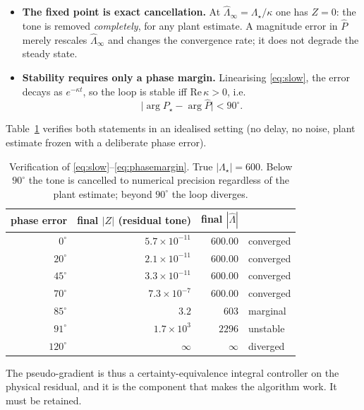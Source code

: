 \documentclass[11pt]{article}
\begin{document}
\begin{itemize}\itemsep2pt
  \item \textbf{The fixed point is exact cancellation.} At
    $\hat\Lambda_\infty=\Lambda_\star/\kappa$ one has $Z=0$: the tone is
    removed \emph{completely}, for any plant estimate. A magnitude error in
    $\hat P$ merely rescales $\hat\Lambda_\infty$ and changes the
    convergence rate; it does not degrade the steady state.
  \item \textbf{Stability requires only a phase margin.} Linearising
    \eqref{eq:slow}, the error decays as $e^{-\kappa t}$, so the loop is
    stable iff $\mathrm{Re}\,\kappa>0$, i.e.
    \begin{equation}
      \big|\arg P_\star-\arg\hat P\big|<90^\circ .
      \label{eq:phasemargin}
    \end{equation}
\end{itemize}

Table~\ref{tab:phase} verifies both statements in an idealised setting
(no delay, no noise, plant estimate frozen with a deliberate phase error).

\begin{table}[h]
  \centering
  \begin{tabular}{rrrl}
    \toprule
    phase error & final $|Z|$ (residual tone) & final $|\hat\Lambda|$ & \\
    \midrule
    $0^\circ$   & $5.7\times10^{-11}$ & $600.00$ & converged\\
    $20^\circ$  & $2.1\times10^{-11}$ & $600.00$ & converged\\
    $45^\circ$  & $3.3\times10^{-11}$ & $600.00$ & converged\\
    $70^\circ$  & $7.3\times10^{-7}$  & $600.00$ & converged\\
    $85^\circ$  & $3.2$               & $603$    & marginal\\
    $91^\circ$  & $1.7\times10^{3}$   & $2296$   & unstable\\
    $120^\circ$ & $\infty$            & $\infty$ & diverged\\
    \bottomrule
  \end{tabular}
  \caption{Verification of \eqref{eq:slow}--\eqref{eq:phasemargin}. True
  $|\Lambda_\star|=600$. Below $90^\circ$ the tone is cancelled to
  numerical precision regardless of the plant estimate; beyond $90^\circ$
  the loop diverges.}
  \label{tab:phase}
\end{table}

The pseudo-gradient is thus a certainty-equivalence integral controller on
the physical residual, and it is the component that makes the algorithm
work. It must be retained.
\end{document}
